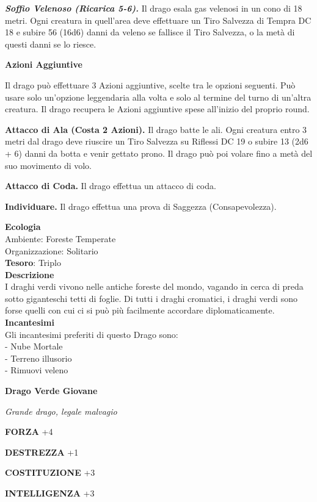 \begin{multicols}{2}
\textit{\textbf{Soffio Velenoso (Ricarica 5-6).}} Il drago esala gas velenosi in un cono di 18 metri. Ogni creatura in quell'area deve effettuare un Tiro Salvezza di Tempra DC 18 e subire 56 (16d6) danni da veleno se fallisce il Tiro Salvezza, o la metà di questi danni se lo riesce.

\textbf{Azioni Aggiuntive}

Il drago può effettuare 3 Azioni aggiuntive, scelte tra le opzioni seguenti. Può usare solo un'opzione leggendaria alla volta e solo al termine del turno di un'altra creatura. Il drago recupera le Azioni aggiuntive spese all'inizio del proprio round.

\textbf{Attacco di Ala (Costa 2 Azioni).} Il drago batte le ali. Ogni creatura entro 3 metri dal drago deve riuscire un Tiro Salvezza su Riflessi DC 19 o subire 13 (2d6 + 6) danni da botta e venir gettato prono. Il drago può poi volare fino a metà del suo movimento di volo.

\textbf{Attacco di Coda.} Il drago effettua un attacco di coda.

\textbf{Individuare.} Il drago effettua una prova di Saggezza (Consapevolezza).

\textbf{Ecologia}\\
Ambiente: Foreste Temperate\\
Organizzazione: Solitario\\
\textbf{Tesoro}: Triplo\\
\textbf{Descrizione}\\
I draghi verdi vivono nelle antiche foreste del mondo, vagando in cerca di preda sotto giganteschi tetti di foglie. Di tutti i draghi cromatici, i draghi verdi sono forse quelli con cui ci si può più facilmente accordare diplomaticamente.\\
\textbf{Incantesimi}\\
Gli incantesimi preferiti di questo Drago sono:\\
- Nube Mortale\\
- Terreno illusorio\\
- Rimuovi veleno


\medskip{}\textbf{Drago Verde Giovane}

\textit{Grande drago, legale malvagio}

\textbf{FORZA} +4

\textbf{DESTREZZA} +1

\textbf{COSTITUZIONE} +3

\textbf{INTELLIGENZA} +3


\end{multicols}
